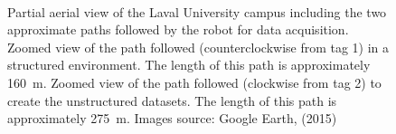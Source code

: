 \begin{figure}
    \centering
    \\ \vspace{3mm}
     \hspace{2mm}
    \caption[Partial aerial view of the Laval University campus including the two approximate paths followed by the robot for data acquisition.]{\protect{} Partial aerial view of the Laval University campus including the two approximate paths followed by the robot for data acquisition. \protect{} Zoomed view of the path followed (counterclockwise from tag 1) in a structured environment. The length of this path is approximately \SI{160}{\meter}. \protect{} Zoomed view of the path followed (clockwise from tag 2) to create the unstructured datasets. The length of this path is approximately \SI{275}{\meter}. Images source: Google Earth, (2015)}
    \label{fig:chap_slam_path}
\end{figure}

